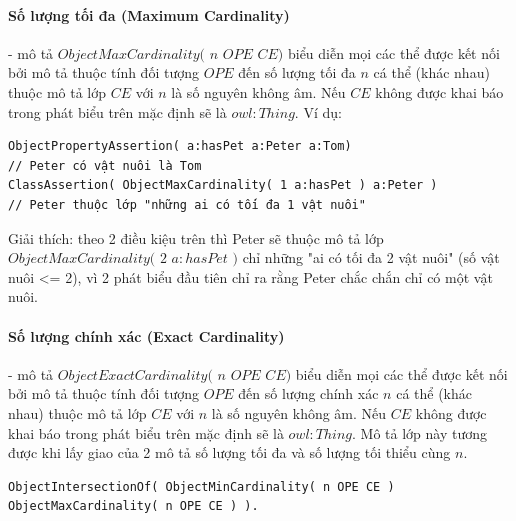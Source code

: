 \paragraph{Số lượng tối đa (Maximum Cardinality)} - mô tả $ ObjectMaxCardinality($ $n$ $OPE$  $CE)$ biểu diễn mọi các thể được kết nối bởi mô tả thuộc tính đối tượng $OPE$ đến số lượng tối đa $n$ cá thể (khác nhau) thuộc mô tả lớp $CE$ với $n$ là số nguyên không âm. Nếu $CE$ không được khai báo trong phát biểu trên mặc định sẽ là $owl:Thing$. Ví dụ:
\begin{verbatim}
ObjectPropertyAssertion( a:hasPet a:Peter a:Tom)
// Peter có vật nuôi là Tom
ClassAssertion( ObjectMaxCardinality( 1 a:hasPet ) a:Peter )
// Peter thuộc lớp "những ai có tối đa 1 vật nuôi"
\end{verbatim}
Giải thích: theo 2 điều kiệu trên thì Peter sẽ thuộc mô tả lớp $ObjectMaxCardinality($ $2$ $a:hasPet$ $)$ chỉ những "ai có tối đa 2 vật nuôi" (số vật nuôi <= 2), vì 2 phát biểu đầu tiên chỉ ra rằng Peter chắc chắn chỉ có một vật nuôi.

\paragraph{Số lượng chính xác (Exact Cardinality)} - mô tả $ObjectExactCardinality($ $n$ $OPE$  $CE)$ biểu diễn mọi các thể được kết nối bởi mô tả thuộc tính đối tượng $OPE$ đến số lượng chính xác $n$ cá thể (khác nhau) thuộc mô tả lớp $CE$ với $n$ là số nguyên không âm. Nếu $CE$ không được khai báo trong phát biểu trên mặc định sẽ là $owl:Thing$. Mô tả lớp này tương được khi lấy giao của 2 mô tả số lượng tối đa và số lượng tối thiểu cùng $n$.
\begin{verbatim}
ObjectIntersectionOf( ObjectMinCardinality( n OPE CE ) 
ObjectMaxCardinality( n OPE CE ) ).
\end{verbatim}

